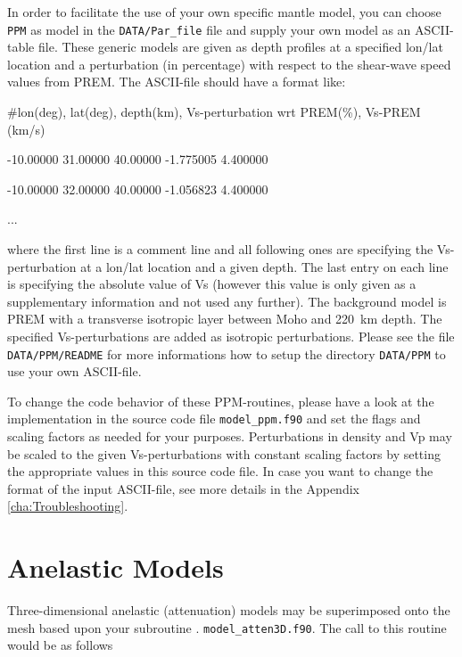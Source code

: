 \documentclass[oneside,english]{book}
\newenvironment{lyxcode}
{\begin{list}{}{
\setlength{\rightmargin}{\leftmargin}
\setlength{\listparindent}{0pt}%
\raggedright
\setlength{\itemsep}{0pt}
\setlength{\parsep}{0pt}
\normalfont\ttfamily}%
 \item[]}
{\end{list}}
\begin{document}
In order to facilitate the use of your own specific mantle model, you can choose \texttt{PPM} as model in the \texttt{DATA/Par\_file} file
and supply your own model as an ASCII-table file. These generic models are given as depth profiles at a specified lon/lat location
and a perturbation (in percentage) with respect to the shear-wave speed values from PREM. The ASCII-file should have a format like:
\begin{lyxcode}
{\footnotesize \#lon(deg), lat(deg), depth(km), Vs-perturbation wrt PREM(\%), Vs-PREM (km/s)}{\footnotesize \par}
{\footnotesize -10.00000       31.00000       40.00000      -1.775005       4.400000}{\footnotesize \par}
{\footnotesize -10.00000       32.00000       40.00000      -1.056823       4.400000}{\footnotesize \par}
{\footnotesize ...}{\footnotesize \par}
\end{lyxcode}
where the first line is a comment line and all following ones are specifying the Vs-perturbation at a lon/lat location and a given depth.
The last entry on each line is specifying the absolute value of Vs (however this value is only given as a supplementary information
and not used any further). The background model is PREM with a transverse isotropic layer between Moho and 220~km depth.
The specified Vs-perturbations are added as isotropic perturbations. Please see the file \texttt{DATA/PPM/README}
for more informations how to setup the directory \texttt{DATA/PPM} to use your own ASCII-file.



To change the code behavior of these PPM-routines, please have a look at the implementation in the source code
file \texttt{model\_ppm.f90} and set the flags and scaling factors as needed for your purposes.
Perturbations in density and Vp may be scaled to the given Vs-perturbations with constant scaling factors by setting the appropriate
values in this source code file. In case you want to change the format of the input ASCII-file, see more details in the Appendix \ref{cha:Troubleshooting}.




\section{{\normalsize \label{sec:Anelastic-Models}}Anelastic Models}

Three-dimensional anelastic (attenuation) models may be superimposed
onto the mesh based upon your subroutine .
\texttt{model\_atten3D.f90}.
The call to this routine would be as follows
\end{document}
